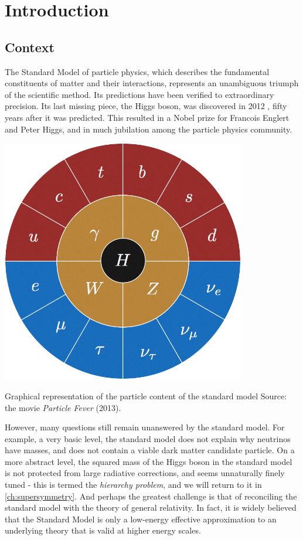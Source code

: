 \chapter{Introduction}\label{ch:introduction}
\section{Context}
The Standard Model of particle physics, which describes the fundamental constituents of matter and their interactions, represents an unambiguous triumph of the scientific method. Its predictions have been verified to extraordinary precision. Its last missing piece, the Higgs boson, was discovered in 2012 \cite{Aad:2012tfa,Chatrchyan:2012xdj}, fifty years after it was predicted. This resulted in a Nobel prize for Francois Englert and Peter Higgs, and in much jubilation among the particle physics community. 

\begin{marginfigure}[2.5cm]
  \centering
  \includegraphics[width=0.8\textwidth]{images/SM-wheel.png}
  \caption{Graphical representation of the particle content of the standard model Source: the movie \emph{Particle Fever} (2013).}
\end{marginfigure}

However, many questions still remain unanswered by the standard model. For example, a very basic level, the standard model does not explain why neutrinos have masses, and does not contain a viable dark matter candidate particle. On a more abstract level, the squared mass of the Higgs boson in the standard model is not protected from large radiative corrections, and seems unnaturally finely tuned - this is termed the \emph{hierarchy problem}, and we will return to it in \autoref{ch:supersymmetry}. And perhaps the greatest challenge is that of reconciling the standard model with the theory of general relativity. In fact, it is widely believed that the Standard Model is only a low-energy effective approximation to an underlying theory that is valid at higher energy scales.

